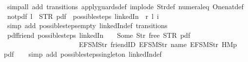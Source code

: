 \begin{isabellebody}
\ {\isacharparenleft}simp{\isacharunderscore}all\ add{\isacharcolon}\ transitions\ apply{\isacharunderscore}guards{\isacharunderscore}def\ implode\ Str{\isacharunderscore}def\ numeral{\isacharunderscore}{}{\isacharunderscore}eq{\isacharunderscore}{}\ One{\isacharunderscore}nat{\isacharunderscore}def{\isacharparenright}%
\endisatagproof
{\isafoldproof}%
%
\isadelimproof
\isanewline
%
\endisadelimproof
\isanewline
{}\isamarkupfalse%
\ not{\isacharunderscore}pdf{\isacharunderscore}{}{\isacharcolon}\ {\isachardoublequoteopen}l\ {\isasymnoteq}\ STR\ {\isacharprime}{\isacharprime}pdf{\isacharprime}{\isacharprime}\ {\isasymLongrightarrow}\ possible{\isacharunderscore}steps\ linkedIn\ {}\ r\ l\ i\ {\isacharequal}\ {\isacharbraceleft}{\isacharbar}{\isacharbar}{\isacharbraceright}{\isachardoublequoteclose}\isanewline
%
\isadelimproof
\ \ %
\endisadelimproof
%
\isatagproof
{}\isamarkupfalse%
\ {\isacharparenleft}simp\ add{\isacharcolon}\ possible{\isacharunderscore}steps{\isacharunderscore}empty\ linkedIn{\isacharunderscore}def\ transitions{\isacharparenright}%
\endisatagproof
{\isafoldproof}%
%
\isadelimproof
\isanewline
%
\endisadelimproof
\isanewline
{}\isamarkupfalse%
\ pdf{\isacharunderscore}friend{\isacharcolon}\ {\isachardoublequoteopen}possible{\isacharunderscore}steps\ linkedIn\ {}\ {\isacharparenleft}{\isacharless}{\isachargreater}{\isacharparenleft}{}\ {\isachardollar}{\isacharcolon}{\isacharequal}\ Some\ {\isacharparenleft}Str\ {\isacharprime}{\isacharprime}free{\isacharprime}{\isacharprime}{\isacharparenright}{\isacharparenright}{\isacharparenright}\ STR\ {\isacharprime}{\isacharprime}pdf{\isacharprime}{\isacharprime}\isanewline
\ \ \ \ \ \ \ \ \ \ \ \ \ \ \ \ \ \ \ \ \ \ {\isacharbrackleft}EFSM{\isachardot}Str\ {\isacharprime}{\isacharprime}friendID{\isacharprime}{\isacharprime}{\isacharcomma}\ EFSM{\isachardot}Str\ {\isacharprime}{\isacharprime}name{\isacharprime}{\isacharprime}{\isacharcomma}\ EFSM{\isachardot}Str\ {\isacharprime}{\isacharprime}HM{}p{\isacharprime}{\isacharprime}{\isacharbrackright}\ {\isacharequal}\ {\isacharbraceleft}{\isacharbar}{\isacharparenleft}{}{\isacharcomma}\ pdf{\isacharparenright}{\isacharbar}{\isacharbraceright}{\isachardoublequoteclose}\isanewline
%
\isadelimproof
\ \ %
\endisadelimproof
%
\isatagproof
{}\isamarkupfalse%
\ {\isacharparenleft}simp\ add{\isacharcolon}\ possible{\isacharunderscore}steps{\isacharunderscore}singleton\ linkedIn{\isacharunderscore}def{\isacharparenright}\isanewline

\end{isabellebody}
